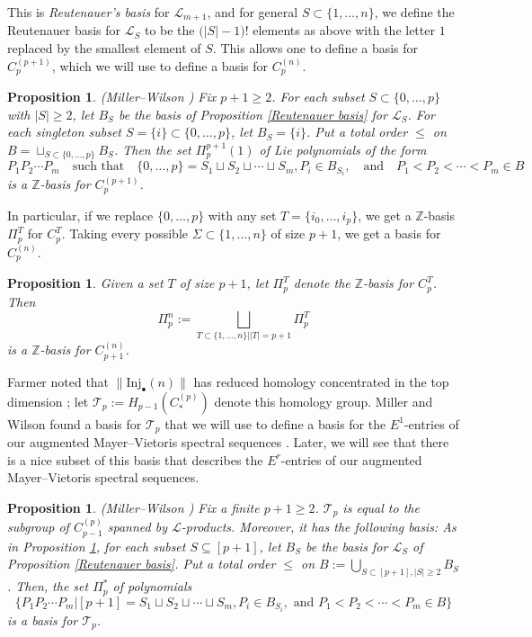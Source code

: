 \documentclass[pagebackref,colorlinks,citecolor=blue,linkcolor=blue,urlcolor=blue,filecolor=blue]{article}
\newtheorem{prop}[thm]{Proposition}
\theoremstyle{definition}\newtheorem{definition}[thm]{Definition}
\theoremstyle{definition}
\newcommand{\Z}{\ensuremath{\mathbb{Z}}}
\begin{document}
This is \emph{Reutenauer's basis} for $\mathcal{L}_{m+1}$, and for  general $S\subset \{1,\dots, n\}$, we define the Reutenauer basis for $\mathcal{L}_{S}$ to be the $\big(|S|-1\big)!$ elements as above with the letter $1$ replaced by the smallest element of $S$.
This allows one to define a basis for $C^{(p+1)}_{p}$, which we will use to define a basis for $C^{(n)}_{p}$.

\begin{prop}\label{basis for inj}
(Miller--Wilson \cite[Theorem 2.35]{miller2019higher})
Fix $p+1\ge 2$. 
For each subset $S\subset \{0, \dots, p\}$ with $|S|\ge 2$, let $B_{S}$ be the basis of Proposition \ref{Reutenauer basis} for $\mathcal{L}_{S}$.
For each singleton subset $S=\{i\}\subset \{0, \dots, p\}$, let $B_{S}=\{i\}$.
Put a total order $\le$ on $B=\sqcup_{S\subset \{0,\dots, p\}}B_{S}$.
Then the set $\Pi^{p+1}_{p}(1)$ of Lie polynomials of the form
\[
P_{1}P_{2}\cdots P_{m}\quad \text{such that}\quad \{0,\dots, p\}=S_{1}\sqcup S_{2}\sqcup \cdots\sqcup S_{m}, P_{i}\in B_{S_{i}},\quad \text{and}\quad P_{1}<P_{2}<\cdots< P_{m}\in B
\]
is a $\Z$-basis for $C^{(p+1)}_{p}$.
\end{prop}

In particular, if we replace $\{0,\dots, p\}$ with any set $T=\{i_{0},\dots, i_{p}\}$, we get a $\Z$-basis $\Pi^{T}_{p}$ for $C^{T}_{p}$.
Taking every possible $\Sigma\subset\{1, \dots, n\}$ of size $p+1$, we get a basis for $C^{(n)}_{p}$. 

\begin{prop}\label{basis for Cnp}
Given a set $T$ of size $p+1$, let $\Pi^{T}_{p}$ denote the $\Z$-basis for $C^{T}_{p}$.
Then
\[
\Pi^{n}_{p}:=\bigsqcup_{T\subset\{1,\dots, n\}\big||T|=p+1}\Pi^{T}_{p}
\]
is a $\Z$-basis for $C^{(n)}_{p+1}$.
\end{prop}

Farmer noted that $\|\text{Inj}_{\bullet}(n)\|$ has reduced homology concentrated in the top dimension \cite{farmer1978cellular}; let $\mathcal{T}_{p}:=H_{p-1}\left(C^{(p)}_{*}\right)$ denote this  homology group.
Miller and Wilson found a basis for $\mathcal{T}_{p}$ that we will use to define a basis for the $E^{1}$-entries of our augmented Mayer--Vietoris spectral sequences \cite{miller2019higher}.
Later, we will see that there is a nice subset of this basis that describes the $E^{r}$-entries of our augmented Mayer--Vietoris spectral sequences.

\begin{prop}\label{basis for top homology of inj word}
(Miller--Wilson \cite[Lemma 2.38 and Theorem 2.40]{miller2019higher})
Fix a finite $p+1\ge 2$. 
$\mathcal{T}_{p}$ is equal to the subgroup of $C^{(p)}_{p-1}$ spanned by $\mathcal{L}$-products. 
Moreover, it has the following basis:
As in Proposition \ref{basis for inj}, for each subset $S\subseteq[p+1]$, let $B_{S}$ be the basis for $\mathcal{L}_{S}$ of Proposition \ref{Reutenauer basis}.
Put a total order $\le$ on $B:=\bigcup_{S\subset [p+1], |S|\ge 2}B_{S}$.
Then, the set $\Pi^{*}_{p}$ of polynomials
\[
\big\{P_{1}P_{2}\cdots P_{m}\big|[p+1]=S_{1}\sqcup S_{2}\sqcup \cdots \sqcup S_{m}, P_{i}\in B_{S_{i}}, \text{ and } P_{1}<P_{2}<\cdots< P_{m}\in B\big\}
\]
is a basis for $\mathcal{T}_{p}$.
\end{prop}
\end{document}
